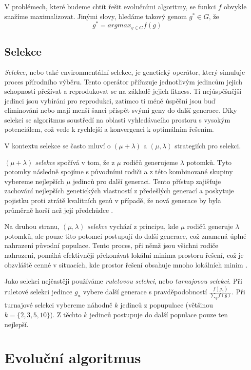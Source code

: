V problémech, které budeme chtít řešit evolučními algoritmy, se funkci $f$ obvykle snažíme maximalizovat. Jinými slovy, hledáme takový genom $g^* \in G$, že 
$$g^* = argmax_{g \in G} f(g)$$

\subsection{Selekce}
\emph{Selekce}, nebo také environmentální selekce, je genetický operátor, který simuluje proces přírodního výběru. Tento operátor přiřazuje jednotlivým jedincům jejich schopnosti přežívat a reprodukovat se na základě jejich fitness. Ti nejúspěšnější jedinci jsou vybíráni pro reprodukci, zatímco ti méně úspěšní jsou buď eliminováni nebo mají menší šanci přispět svými geny do další generace. Díky selekci se algoritmus soustředí na oblasti vyhledávacího prostoru s vysokým potenciálem, což vede k rychlejší a konvergenci k optimálním řešením. 

V kontextu selekce se často mluví o $(\mu + \lambda)$ a $(\mu, \lambda)$ strategiích pro selekci. 

\emph{$(\mu + \lambda)$ selekce} spočívá v tom, že z $\mu$ rodičů generujeme $\lambda$ potomků. Tyto potomky následně spojíme s původními rodiči a z této kombinované skupiny vybereme nejlepších $\mu$ jedinců pro další generaci. Tento přístup zajišťuje zachování nejlepších genetických vlastností z předešlých generací a poskytuje pojistku proti ztrátě kvalitních genů v případě, že nová generace by byla průměrně horší než její předchůdce \cite{EibenSmith2015}.

Na druhou stranu, \emph{$(\mu, \lambda)$ selekce} vychází z principu, kde $\mu$ rodičů generuje $\lambda$ potomků, ale pouze tito potomci postupují do další generace, což znamená úplné nahrazení původní populace. Tento proces, při němž jsou všichni rodiče nahrazení, pomáhá efektivněji překonávat lokální minima prostoru řešení, což je obzvláště cenné v situacích, kde prostor řešení obsahuje mnoho lokálních minim \cite{EibenSmith2015}.

Jako selekci nejčastěji používáme \emph{ruletovou selekci}, nebo \emph{turnajovou selekci}. Při ruletové selekci jedince $g_a$ vybere další generace s pravděpodobností $\frac{f(g_a)}{\sum_g f(g)}$. Při turnajové selekci vybereme náhodně $k$ jedinců z popupulace (většinou $k = \{2,3,5,10\}$). Z těchto $k$ jedinců postupuje do další populace pouze ten nejlepší.

\section{Evoluční algoritmus}


